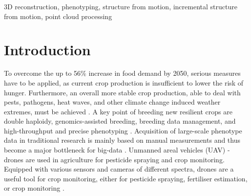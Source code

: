 \documentclass[conference,]{IEEEtran}
\begin{document}
\begin{IEEEkeywords}
3D reconstruction, phenotyping, structure from motion, incremental
structure from motion, point cloud processing
\end{IEEEkeywords}




\maketitle


%
\IEEEpeerreviewmaketitle

\ifdefined\Shaded\renewenvironment{Shaded}{\begin{tcolorbox}[sharp corners, interior hidden, boxrule=0pt, borderline west={3pt}{0pt}{shadecolor}, frame hidden, enhanced, breakable]}{\end{tcolorbox}}\fi


\hypertarget{introduction}{%
\section{Introduction}\label{introduction}}

To overcome the up to 56\% increase in food demand by 2050, serious
measures have to be applied, as current crop production is insufficient
to lower the risk of hunger. Furthermore, an overall more stable crop
production, able to deal with pests, pathogens, heat waves, and other
climate change induced weather extremes, must be achieved
\autocite{vandijk2021}. A key point of breeding new resilient crops are
double haploidy, genomics-assisted breeding, breeding data management,
and high-throughput and precise phenotyping
\autocite{prasanna2021,araus2018}. Acquisition of large-scale phenotype
data in traditional research is mainly based on manual measurements and
thus become a major bottleneck for big-data \autocite{yang2020}.
Unmanned areal vehicles (UAV) - drones are used in agriculture for
pesticide spraying and crop monitoring. Equipped with various sensors
and cameras of different spectra, drones are a useful tool for crop
monitoring, either for pesticide spraying, fertiliser estimation, or
crop monitoring \autocite{mogili2018}.
\end{document}
